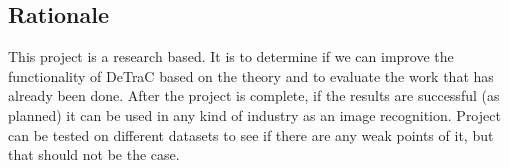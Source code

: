 \subsection{Rationale}
This project is a research based. It is to determine if we can improve the functionality of DeTraC based on the theory and to evaluate the work that has already been done.
\newline
After the project is complete, if the results are successful (as planned) it can be used in any kind of industry as an image recognition. Project can be tested on different datasets to see if there are any weak points of it, but that should not be the case.